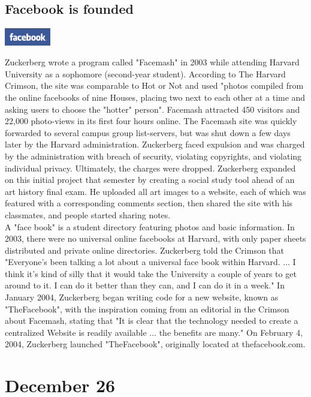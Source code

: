 \documentclass[11pt]{report}
\begin{document}
\subsection{Facebook is founded}
\vspace{2mm}\begin{center}\includegraphics[width=2cm]{./img/facebook.jpg}\end{center}
Zuckerberg wrote a program called "Facemash" in 2003 while attending Harvard University as a sophomore (second-year student). According to The Harvard Crimson, the site was comparable to Hot or Not and used "photos compiled from the online facebooks of nine Houses, placing two next to each other at a time and asking users to choose the "hotter" person". Facemash attracted 450 visitors and 22,000 photo-views in its first four hours online. The Facemash site was quickly forwarded to several campus group list-servers, but was shut down a few days later by the Harvard administration. Zuckerberg faced expulsion and was charged by the administration with breach of security, violating copyrights, and violating individual privacy. Ultimately, the charges were dropped. Zuckerberg expanded on this initial project that semester by creating a social study tool ahead of an art history final exam. He uploaded all art images to a website, each of which was featured with a corresponding comments section, then shared the site with his classmates, and people started sharing notes.\\
A "face book" is a student directory featuring photos and basic information. In 2003, there were no universal online facebooks at Harvard, with only paper sheets distributed and private online directories. Zuckerberg told the Crimson that "Everyone's been talking a lot about a universal face book within Harvard. ... I think it's kind of silly that it would take the University a couple of years to get around to it. I can do it better than they can, and I can do it in a week." In January 2004, Zuckerberg began writing code for a new website, known as "TheFacebook", with the inspiration coming from an editorial in the Crimson about Facemash, stating that "It is clear that the technology needed to create a centralized Website is readily available ... the benefits are many." On February 4, 2004, Zuckerberg launched "TheFacebook", originally located at thefacebook.com.

\section{December 26}
\end{document}
